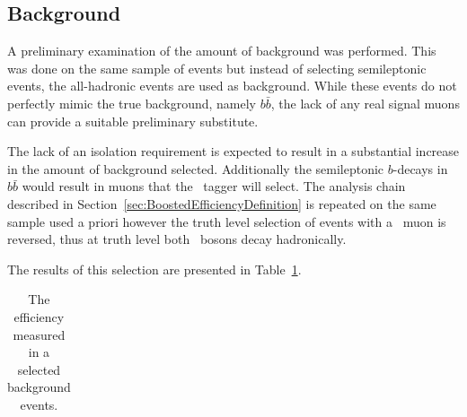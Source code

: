 \subsection{Background}

A preliminary examination of the amount of background was performed. This was done on the same sample of events but instead of selecting semileptonic events, the all-hadronic events are used as background. While these events do not perfectly mimic the true background, namely $b\bar{b}$, the lack of any real signal muons can provide a suitable preliminary substitute.

The lack of an isolation requirement is expected to result in a substantial increase in the amount of background selected. Additionally the semileptonic $b$-decays in $b\bar{b}$ would result in muons that the \xsm\ tagger will select. The analysis chain described in Section~\ref{sec:BoostedEfficiencyDefinition} is repeated on the same sample used a priori however the truth level selection of events with a \W\ muon is reversed, thus at truth level both \W\ bosons decay hadronically.

The results of this selection are presented in Table~\ref{tab:BoostedBackgroundResults}.

\begin{table}
  \caption{The efficiency measured in a selected background events.} \label{tab:BoostedBackgroundResults}
  \begin{tabular}{|c|c|}
  \end{tabular}
\end{table}

